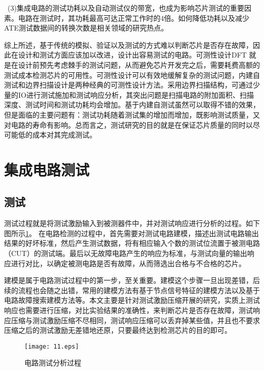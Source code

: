  (3)集成电路的测试功耗以及自动测试仪的带宽，也成为影响芯片测试的重要因素。电路在测试时，其功耗最高可达正常工作时的4倍。如何降低功耗\cite{11,12}以及减少ATE测试数据间的转换次数是相关领域的研究热点\cite{13,14}。

综上所述，基于传统的模拟、验证以及测试的方式难以判断芯片是否存在故障，因此在设计和测试方面应该加以改进\cite{15,16}，设计出容易测试的电路。可测性设计DFT\cite{17} 就是在设计前预先考虑棘手的测试问题，从而避免芯片开发完之后，需要耗费高额的测试成本检测芯片的可用性。可测性设计可以有效地缓解复杂的测试问题，内建自测试和边界扫描设计是两种经典的可测性设计方法。采用边界扫描结构，可通过少量的IO进行测试施加和测试响应分析，其突出问题是扫描电路的附加面积、扫描深度、测试时间和测试功耗均会增加。基于内建自测试虽然可以取得不错的效果，但是面临的主要问题有：测试功耗随着测试集的增加而增加，既影响测试质量，又对电路的寿命有影响\cite{18}。总而言之，测试研究的目的就是在保证芯片质量的同时以尽可能低的成本对其完成测试。

\section{集成电路测试}

\subsection{测试}
测试过程就是将测试激励输入到被测器件中，并对测试响应进行分析的过程。如下图所示\ref{11}。 在电路检测的过程中，首先需要对测试电路建模，描述出测试电路输出结果的好坏标准，然后产生测试数据，将有相应输入个数的测试位流置于被测电路（CUT）的测试端。最后以无故障电路产生的响应为标准，与测试向量的输出响应进行对比，以确定被测电路是否有故障，从而筛选出合格与不合格的芯片。

建模是属于电路测试过程中的第一步，至关重要。建模这个步骤一旦出现差错，后续的流程也会随之出错，常用的建模方法有基于节点信号特征的建模方法以及基于电路故障搜索建模方法等。本文主要是针对测试激励压缩开展的研究，实质上测试响应也需要进行压缩，对比实验结果的准确性，来判断芯片是否存在故障，测试响应压缩与测试激励压缩不尽相同，测试响应压缩可以丢弃掉某些值，并且也不要求压缩之后的测试激励无差错地还原，只要最终达到检测芯片的目的即可。

\begin{figure}[H]
  \centering
  \texttt{[image: 11.eps]}
  \vspace*{0\baselineskip}
  \caption{电路测试分析过程}\label{11}
  \vspace{\baselineskip}
     \end{figure}


